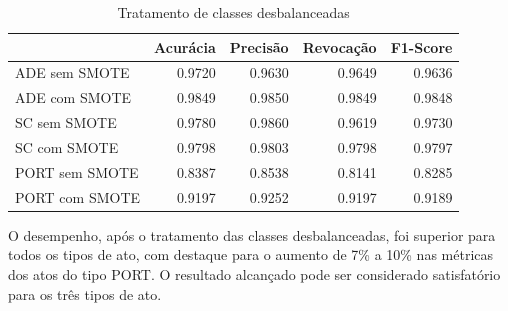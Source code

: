 \begin{table}[h]
\caption{Tratamento de classes desbalanceadas}
\label{tab:resultados-oversampling}
	\begin{center}
	\begin{tabular}{lrrrr}
		\toprule
		{} &  Acurácia &  Precisão &  Revocação &      F1-Score \\
		\midrule
		ADE sem SMOTE        &    0.9720 &    0.9630 &     0.9649 &  0.9636 \\
		ADE com SMOTE    &    0.9849 &    0.9850 &     0.9849 &  0.9848 \\
		SC sem SMOTE     &    0.9780 &    0.9860 &     0.9619 &  0.9730 \\
		SC com SMOTE &    0.9798 &    0.9803 &     0.9798 &  0.9797 \\
		PORT sem SMOTE     &    0.8387 &    0.8538 &     0.8141 &  0.8285 \\
		PORT com SMOTE &    0.9197 &    0.9252 &     0.9197 &  0.9189 \\
		\bottomrule
	\end{tabular}
	\end{center}		
\end{table}

O desempenho, após o tratamento das classes desbalanceadas, foi superior para todos os tipos de ato, com destaque para o aumento de 7\% a 10\% nas métricas dos atos do tipo PORT. O resultado alcançado pode ser considerado satisfatório para os três tipos de ato.
